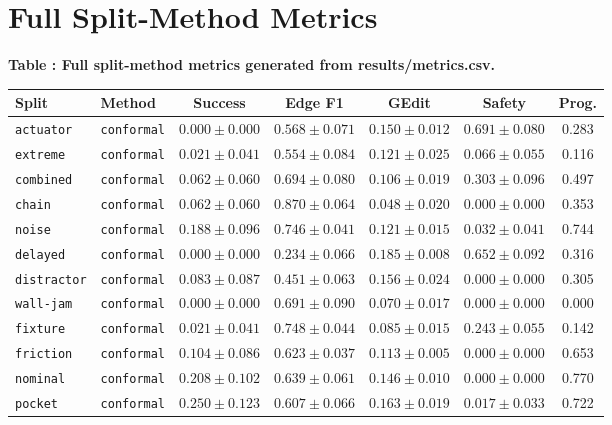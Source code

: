 \documentclass{article}
\begin{document}
\section{Full Split-Method Metrics}
\tiny
\begin{center}
\label{tab:fullmetrics}\textbf{Table \thetable: Full split-method metrics generated from results/metrics.csv.}\\[0.4ex]
\begin{tabular}{llccccc}
\toprule
Split & Method & Success & Edge F1 & GEdit & Safety & Prog. \\
\midrule
\texttt{actuator} & \texttt{conformal} & $0.000 \pm 0.000$ & $0.568 \pm 0.071$ & $0.150 \pm 0.012$ & $0.691 \pm 0.080$ & 0.283 \\
\texttt{extreme} & \texttt{conformal} & $0.021 \pm 0.041$ & $0.554 \pm 0.084$ & $0.121 \pm 0.025$ & $0.066 \pm 0.055$ & 0.116 \\
\texttt{combined} & \texttt{conformal} & $0.062 \pm 0.060$ & $0.694 \pm 0.080$ & $0.106 \pm 0.019$ & $0.303 \pm 0.096$ & 0.497 \\
\texttt{chain} & \texttt{conformal} & $0.062 \pm 0.060$ & $0.870 \pm 0.064$ & $0.048 \pm 0.020$ & $0.000 \pm 0.000$ & 0.353 \\
\texttt{noise} & \texttt{conformal} & $0.188 \pm 0.096$ & $0.746 \pm 0.041$ & $0.121 \pm 0.015$ & $0.032 \pm 0.041$ & 0.744 \\
\texttt{delayed} & \texttt{conformal} & $0.000 \pm 0.000$ & $0.234 \pm 0.066$ & $0.185 \pm 0.008$ & $0.652 \pm 0.092$ & 0.316 \\
\texttt{distractor} & \texttt{conformal} & $0.083 \pm 0.087$ & $0.451 \pm 0.063$ & $0.156 \pm 0.024$ & $0.000 \pm 0.000$ & 0.305 \\
\texttt{wall-jam} & \texttt{conformal} & $0.000 \pm 0.000$ & $0.691 \pm 0.090$ & $0.070 \pm 0.017$ & $0.000 \pm 0.000$ & 0.000 \\
\texttt{fixture} & \texttt{conformal} & $0.021 \pm 0.041$ & $0.748 \pm 0.044$ & $0.085 \pm 0.015$ & $0.243 \pm 0.055$ & 0.142 \\
\texttt{friction} & \texttt{conformal} & $0.104 \pm 0.086$ & $0.623 \pm 0.037$ & $0.113 \pm 0.005$ & $0.000 \pm 0.000$ & 0.653 \\
\texttt{nominal} & \texttt{conformal} & $0.208 \pm 0.102$ & $0.639 \pm 0.061$ & $0.146 \pm 0.010$ & $0.000 \pm 0.000$ & 0.770 \\
\texttt{pocket} & \texttt{conformal} & $0.250 \pm 0.123$ & $0.607 \pm 0.066$ & $0.163 \pm 0.019$ & $0.017 \pm 0.033$ & 0.722 \\

\end{tabular}
\end{center}
\end{document}
